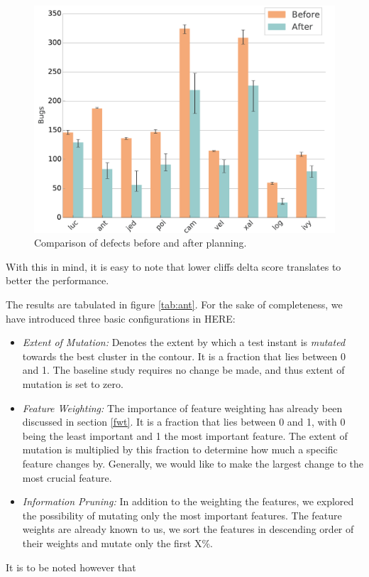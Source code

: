 \documentclass[conference]{IEEEtran}
\newcommand{\bi}{\begin{itemize}}
\newcommand{\ei}{\end{itemize}}
\begin{document}
\begin{figure}[tbp]
\centering
\includegraphics[width=\linewidth]{_figs/histograms.pdf}
\caption{Comparison of defects before and after planning.}
\label{fig:bugs}
\end{figure}
With this in mind, it is easy to note that lower cliffs delta score translates to better the performance. 

 
The results are tabulated in figure \ref{tab:ant}. For the sake of completeness, we have introduced three basic configurations in HERE: 
\bi
\item \textit{Extent of Mutation:} Denotes the extent by which a test instant is \textit{mutated} towards the best cluster in the contour. It is a fraction that lies between 0 and 1. The baseline study requires no change be made, and thus extent of mutation is set to zero.
\item \textit{Feature Weighting:} The importance of feature weighting has already been discussed in section \ref{fwt}. It is a fraction that lies between 0 and 1, with 0 being the least important and 1 the most important feature. The extent of mutation is multiplied by this fraction to determine how much a specific feature changes by. Generally, we would like to make the largest change to the most crucial feature.
\item \textit{Information Pruning:} In addition to the weighting the features, we explored the possibility of mutating only the most important features. The feature weights are already known to us, we sort the features in descending order of their weights and mutate only the first X\%.
\ei
It is to be noted however that 
\end{document}
